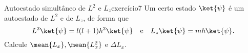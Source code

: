 \begin{exercício}{Autoestado simultâneo de \(L^2\) e \(L_z\)}{exercício7}
    Um certo estado \(\ket{\psi}\) é um autoestado de \(L^2\) e de \(L_z\), de forma que
    \begin{equation*}
        L^2\ket{\psi} = l(l+1)\hbar^2 \ket{\psi}\quad\text{e}\quad L_z\ket{\psi} = m\hbar \ket{\psi}.
    \end{equation*}
    Calcule \(\mean{L_x}, \mean{L_x^2}\) e \(\Delta L_x\).
\end{exercício}
